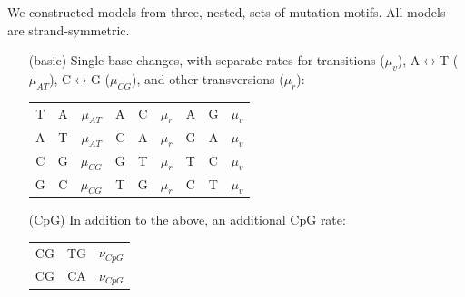 \documentclass{article}
\newcommand{\nA}{\mbox{A}}  %
\newcommand{\nC}{\mbox{C}}
\newcommand{\nG}{\mbox{G}}
\newcommand{\nT}{\mbox{T}}
\theoremstyle{plain}
\theoremstyle{definition}
\begin{document}
We constructed models from three, nested, sets of mutation motifs.
All models are strand-symmetric.
\begin{itemize}
    \item[(basic)]
        Single-base changes, with separate rates for transitions ($\mu_v$),
        \nA$\leftrightarrow$\nT{} ($\mu_{AT}$), \nC$\leftrightarrow$\nG{} ($\mu_{CG}$),
        and other transversions ($\mu_{r}$):
          \begin{center}
            \begin{tabular}{c@{\quad$\to$\quad}c@{\quad at rate\quad }c|c@{\quad$\to$\quad}c@{\quad at rate\quad }c|c@{\quad$\to$\quad}c@{\quad at rate\quad }c}
                \nT  &   \nA   &  $\mu_{AT}$ & \nA  &   \nC   &  $\mu_{r}$ & \nA  &   \nG   &  $\mu_{v}$ \\
                \nA  &   \nT   &  $\mu_{AT}$ & \nC  &   \nA   &  $\mu_{r}$ & \nG  &   \nA   &  $\mu_{v}$ \\
                \nC  &   \nG   &  $\mu_{CG}$ & \nG  &   \nT   &  $\mu_{r}$ & \nT  &   \nC   &  $\mu_{v}$ \\
                \nG  &   \nC   &  $\mu_{CG}$ & \nT  &   \nG   &  $\mu_{r}$ & \nC  &   \nT   &  $\mu_{v}$ \\
            \end{tabular}
          \end{center}

      \item[(CpG)] In addition to the above, an additional CpG rate:
          \begin{center}
            \begin{tabular}{c@{\quad$\to$\quad}c@{\quad at rate\quad }c}
                CG  &   TG   &  $\nu_{CpG}$ \\
                CG  &   CA   &  $\nu_{CpG}$ \\
            \end{tabular}
          \end{center}


\end{itemize}
\end{document}
